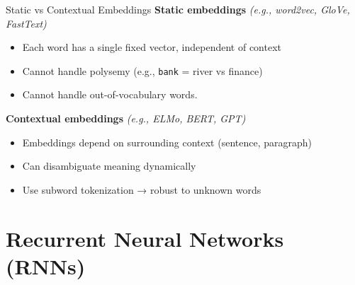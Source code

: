 \documentclass[aspectratio=169]{beamer}
\begin{document}
\begin{frame}{Static vs Contextual Embeddings}
\vspace{1em}
\textbf{Static embeddings}
  \textit{(e.g., word2vec, GloVe, FastText)}
  \begin{itemize}
    \item Each word has a single fixed vector, independent of context
    \item Cannot handle polysemy (e.g., \texttt{bank} = river vs finance)
    \item Cannot handle out-of-vocabulary words.
  \end{itemize}


\textbf{Contextual embeddings}
  \textit{(e.g., ELMo, BERT, GPT)}
  \begin{itemize}
    \item Embeddings depend on surrounding context (sentence, paragraph)
    \item Can disambiguate meaning dynamically
    \item Use subword tokenization → robust to unknown words
  \end{itemize}

\end{frame}




\section{Recurrent Neural Networks (RNNs)}
\end{document}
